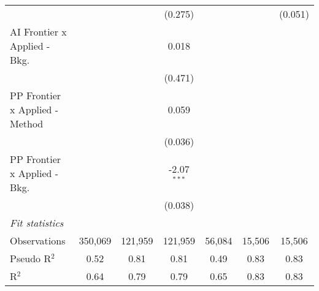 \begin{tabular}{lcccccc}
                                  &                &                & (0.275)        &                &                & (0.051)\\   
   AI Frontier x Applied - Bkg.   &                &                & 0.018          &                &                &   \\   
                                  &                &                & (0.471)        &                &                &   \\   
   PP Frontier x Applied - Method &                &                & 0.059          &                &                &   \\   
                                  &                &                & (0.036)        &                &                &   \\   
   PP Frontier x Applied - Bkg.   &                &                & -2.07$^{***}$  &                &                &   \\   
                                  &                &                & (0.038)        &                &                &   \\   
   \midrule
   \emph{Fit statistics}\\
   Observations                   & 350,069        & 121,959        & 121,959        & 56,084         & 15,506         & 15,506\\  
   Pseudo R$^2$                   & 0.52           & 0.81           & 0.81           & 0.49           & 0.83           & 0.83\\  
   R$^2$                          & 0.64           & 0.79           & 0.79           & 0.65           & 0.83           & 0.83\\  
   

\end{tabular}
